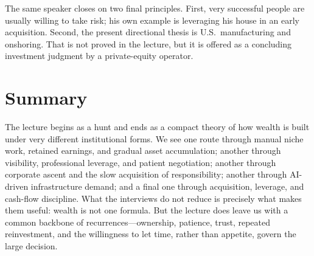 The same speaker closes on two final principles. First, very successful people are usually willing to take risk; his own example is leveraging his house in an early acquisition. Second, the present directional thesis is U.S.\ manufacturing and onshoring. That is not proved in the lecture, but it is offered as a concluding investment judgment by a private-equity operator.

\section{Summary}

The lecture begins as a hunt and ends as a compact theory of how wealth is built under very different institutional forms. We see one route through manual niche work, retained earnings, and gradual asset accumulation; another through visibility, professional leverage, and patient negotiation; another through corporate ascent and the slow acquisition of responsibility; another through AI-driven infrastructure demand; and a final one through acquisition, leverage, and cash-flow discipline. What the interviews do not reduce is precisely what makes them useful: wealth is not one formula. But the lecture does leave us with a common backbone of recurrences---ownership, patience, trust, repeated reinvestment, and the willingness to let time, rather than appetite, govern the large decision.